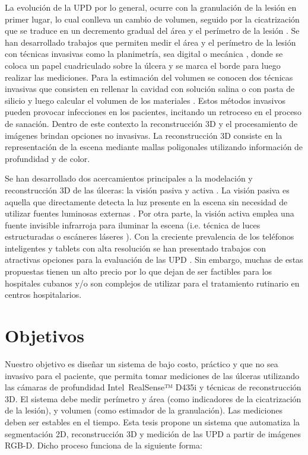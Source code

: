 La evolución de la UPD por lo general, ocurre con la granulación de la lesión en primer lugar, lo cual conlleva un cambio de volumen, seguido por la cicatrización que se traduce en un decremento gradual del área y el perímetro de la lesión  \cite{kecelj2007measurement}. Se han desarrollado trabajos que permiten medir el área y el perímetro de la lesión con técnicas invasivas como la planimetría, sea digital o mecánica \cite{oien2002measuring}, donde se coloca un papel cuadriculado sobre la úlcera y se marca el borde para luego realizar las mediciones. Para la estimación del volumen se conocen dos técnicas invasivas que consisten en rellenar la cavidad con solución salina o con pasta de silicio y luego calcular el volumen de los materiales \cite{langemo2008measuring}. Estos métodos invasivos pueden provocar infecciones en los pacientes, incitando un retroceso en el proceso de sanación. Dentro de este contexto la reconstrucción 3D y el procesamiento de imágenes brindan opciones no invasivas. La reconstrucción 3D consiste en la representación de la escena mediante mallas poligonales utilizando información de profundidad y de color.

Se han desarrollado dos acercamientos principales a la modelación y reconstrucción 3D de las úlceras: la visión pasiva y activa \cite{zenteno2018volumetric}. La visión pasiva es aquella que directamente detecta la luz presente en la escena sin necesidad de utilizar fuentes luminosas externas \cite{malian2004medphos, plassmann1998mavis}. Por otra parte, la visión activa emplea una fuente invisible infrarroja para iluminar la escena (i.e. técnica de luces estructuradas \cite{filko2018wound, ching2022segm3d, ozturk1996new} o escáneres láseres \cite{callieri2003derma, krouskop2002noncontact}). Con la creciente prevalencia de los teléfonos inteligentes y tablets con alta resolución se han presentado trabajos con atractivas opciones para la evaluación de las UPD \cite{foltynski2014new, wang2014smartphone}. Sin embargo, muchas de estas propuestas tienen un alto precio por lo que dejan de ser factibles para los hospitales cubanos y/o son complejos de utilizar para el tratamiento rutinario en centros hospitalarios.

\section*{Objetivos}

Nuestro objetivo es diseñar un sistema de bajo costo, práctico y que no sea invasivo para el paciente, que permita tomar mediciones de las úlceras utilizando las cámaras de profundidad Intel~\textregistered RealSense™ D435i y técnicas de reconstrucción 3D. El sistema debe medir perímetro y área (como indicadores de la cicatrización de la lesión), y volumen (como estimador de la granulación). Las mediciones deben ser estables en el tiempo. Esta tesis propone un sistema que automatiza la segmentación 2D, reconstrucción 3D y medición de las UPD a partir de imágenes RGB-D. Dicho proceso funciona de la siguiente forma: 

